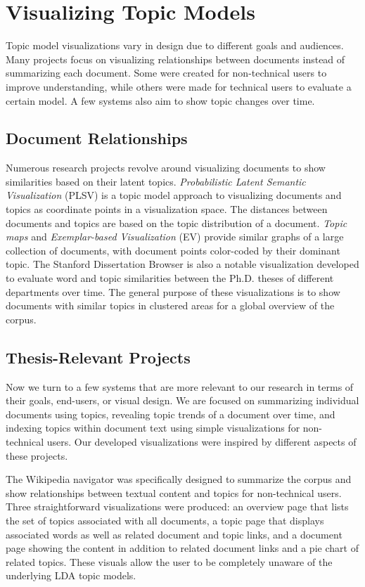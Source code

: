 \section{Visualizing Topic Models}

Topic model visualizations vary in design due to different goals and audiences. Many projects focus on visualizing relationships between documents instead of summarizing each document. Some were created for non-technical users to improve understanding, while others were made for technical users to evaluate a certain model. A few systems also aim to show topic changes over time.

\subsection{Document Relationships}

Numerous research projects revolve around visualizing documents to show similarities based on their latent topics. \textit{Probabilistic Latent Semantic Visualization} (PLSV) \cite{plsv} is a topic model approach to visualizing documents and topics as coordinate points in a visualization space. The distances between documents and topics are based on the topic distribution of a document. \textit{Topic maps} \cite{topic-maps} and \textit{Exemplar-based Visualization} (EV) \cite{ev} provide similar graphs of a large collection of documents, with document points color-coded by their dominant topic. The Stanford Dissertation Browser \cite{interpretation-trust} is also a notable visualization developed to evaluate word and topic similarities between the Ph.D. theses of different departments over time. The general purpose of these visualizations is to show documents with similar topics in clustered areas for a global overview of the corpus.

\subsection{Thesis-Relevant Projects}

Now we turn to a few systems that are more relevant to our research in terms of their goals, end-users, or visual design. We are focused on summarizing individual documents using topics, revealing topic trends of a document over time, and indexing topics within document text using simple visualizations for non-technical users. Our developed visualizations were inspired by different aspects of these projects.

The Wikipedia navigator \cite{wikipedia} was specifically designed to summarize the corpus and show relationships between textual content and topics for non-technical users. Three straightforward visualizations were produced: an overview page that lists the set of topics associated with all documents, a topic page that displays associated words as well as related document and topic links, and a document page showing the content in addition to related document links and a pie chart of related topics. These visuals allow the user to be completely unaware of the underlying LDA topic models.

